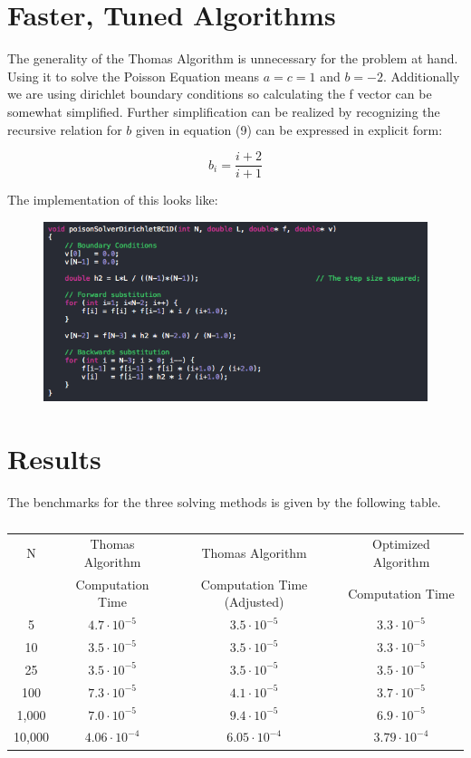 \documentclass{article}
\begin{document}
\section{Faster, Tuned Algorithms}
The generality of the Thomas Algorithm is unnecessary for the problem at hand.  Using it to solve the Poisson Equation means $a=c=1$ and $b=-2$.  Additionally we are using dirichlet boundary conditions so calculating the f vector can be somewhat simplified.  Further simplification can be realized by recognizing the recursive relation for $b$ given in equation (9) can be expressed in explicit form:

\begin{equation}
b_i = \frac{i+2}{i+1}
\end{equation}

The implementation of this looks like:

\begin{figure}[H]
	\centering
	\includegraphics[width=0.8\linewidth]{cppPoissonSolverFast.png}
	\caption{}
\end{figure}



\section{Results}
The benchmarks for the three solving methods is given by the following table.

\begin{table}[H]
	\centering
	\begin{tabular}{ c | c | c | c }
		N      &  Thomas Algorithm    &       Thomas Algorithm      & Optimized Algorithm  \\
		       &  Computation Time    & Computation Time (Adjusted) &  Computation Time    \\
		\hline
		5      & $4.7 \cdot 10^{-5}$  &     $3.5 \cdot 10^{-5}$     & $3.3 \cdot 10^{-5}$  \\
		\hline
		10     & $3.5 \cdot 10^{-5}$  &     $3.5 \cdot 10^{-5}$     & $3.3 \cdot 10^{-5}$  \\
		\hline
		25     & $3.5 \cdot 10^{-5}$  &     $3.5 \cdot 10^{-5}$     & $3.5 \cdot 10^{-5}$  \\
		\hline
		100    & $7.3 \cdot 10^{-5}$  &     $4.1 \cdot 10^{-5}$     & $3.7 \cdot 10^{-5}$  \\
		\hline
		1,000  & $7.0 \cdot 10^{-5}$  &     $9.4 \cdot 10^{-5}$     & $6.9 \cdot 10^{-5}$  \\
		\hline
		10,000 & $4.06 \cdot 10^{-4}$ &     $6.05 \cdot 10^{-4}$    & $3.79 \cdot 10^{-4}$
	\end{tabular}
	\caption{ \label{table:}}
\end{table}
\end{document}

